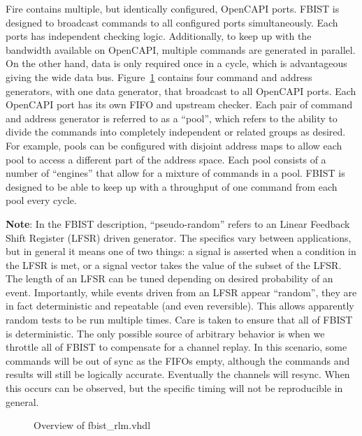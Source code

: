 Fire contains multiple, but identically configured, OpenCAPI
ports. FBIST is designed to broadcast commands to all configured ports
simultaneously. Each ports has independent checking
logic. Additionally, to keep up with the bandwidth available on
OpenCAPI, multiple commands are generated in parallel. On the other
hand, data is only required once in a cycle, which is advantageous
giving the wide data bus. Figure~\ref{fig:fbist_overview} contains
four command and address generators, with one data generator, that
broadcast to all OpenCAPI ports. Each OpenCAPI port has its own FIFO
and upstream checker. Each pair of command and address generator is
referred to as a ``pool'', which refers to the ability to divide the
commands into completely independent or related groups as desired. For
example, pools can be configured with disjoint address maps to allow
each pool to access a different part of the address space. Each pool
consists of a number of ``engines'' that allow for a mixture of
commands in a pool. FBIST is designed to be able to keep up with a
throughput of one command from each pool every cycle.

\textbf{Note}: In the FBIST description, ``pseudo-random'' refers to an
Linear Feedback Shift Register (LFSR) driven generator. The specifics
vary between applications, but in general it means one of two things:
a signal is asserted when a condition in the LFSR is met, or a signal
vector takes the value of the subset of the LFSR. The length of an
LFSR can be tuned depending on desired probability of an
event. Importantly, while events driven from an LFSR appear
``random'', they are in fact deterministic and repeatable (and even
reversible). This allows apparently random tests to be run multiple
times. Care is taken to ensure that all of FBIST is deterministic. The
only possible source of arbitrary behavior is when we throttle all of
FBIST to compensate for a channel replay. In this scenario, some
commands will be out of sync as the FIFOs empty, although the commands
and results will still be logically accurate. Eventually the channels
will resync. When this occurs can be observed, but the specific timing
will not be reproducible in general.

\begin{figure}[h]
  \begin{center}
    
  \end{center}
  \caption[Overview of fbist\_rlm.vhdl]{\label{fig:fbist_overview}Overview of fbist\_rlm.vhdl
  }
\end{figure}

